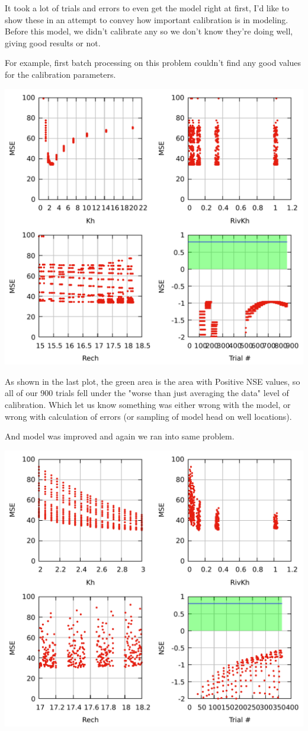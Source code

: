 \documentclass[titlepage,12pt]{unisubmission}
\begin{document}
It took a lot of trials and errors to even get the model right at first, I'd like to show these in an attempt to convey how important calibration is in modeling. Before this model, we didn't calibrate any so we don't know they're doing well, giving good results or not.

For example, first batch processing on this problem couldn't find any good values for the calibration parameters.

\begin{center}
\includegraphics[width=.9\linewidth]{./images/4_trial1.pdf}
\end{center}

As shown in the last plot, the green area is the area with Positive NSE values, so all of our 900 trials fell under the "worse than just averaging the data" level of calibration. Which let us know something was either wrong with the model, or wrong with calculation of errors (or sampling of model head on well locations).

And model was improved and again we ran into same problem.

\begin{center}
\includegraphics[width=.9\linewidth]{./images/4_trial2.pdf}
\end{center}
\end{document}
